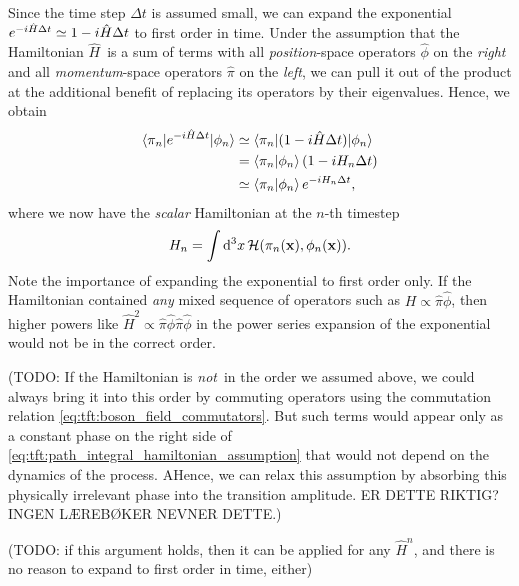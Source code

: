 Since the time step $\Delta t$ is assumed small, we can expand the exponential $e^{- i \hat{H} \Delta t} \simeq 1 - i \hat{H} \Delta t$ to first order in time.
Under the assumption that the Hamiltonian $\hat{H}$ is a sum of terms with all \emph{position}-space operators $\hat{\phi}$ on the \emph{right} and all \emph{momentum}-space operators $\hat{\pi}$ on the \emph{left}, we can pull it out of the product at the additional benefit of replacing its operators by their eigenvalues.
Hence, we obtain
\begin{equation}
\begin{split}
	\braket{\pi_n | e^{- i \hat{H} \Delta t} | \phi_n} &\simeq \braket{\pi_n | (1 - i \hat{H} \Delta t) | \phi_n} \\
	                                                   &=       \braket{\pi_n | \phi_n} (1 - i H_n \Delta t) \\
	                                                   &\simeq \braket{\pi_n | \phi_n} e^{- i H_n \Delta t}, \\
\end{split}
\label{eq:tft:path_integral_hamiltonian_assumption}
\end{equation}
where we now have the \emph{scalar} Hamiltonian at the $n$-th timestep
\begin{equation}
	H_n = \int \mathop{}\!\mathrm{d}^3 x \, \mathcal{H}(\pi_n(\mathbf{x}), \phi_n(\mathbf{x})) .
\label{eq:tft:hamiltonian_eigenvalues}
\end{equation}
Note the importance of expanding the exponential to first order only.
If the Hamiltonian contained \emph{any} mixed sequence of operators such as $H \propto \hat{\pi} \hat{\phi}$, then higher powers like $\hat{H}^2 \propto \hat{\pi} \hat{\phi} \hat{\pi} \hat{\phi}$ in the power series expansion of the exponential would not be in the correct order.

(TODO: If the Hamiltonian is \emph{not} in the order we assumed above, we could always bring it into this order by commuting operators using the commutation relation \eqref{eq:tft:boson_field_commutators}.
But such terms would appear only as a constant phase on the right side of \eqref{eq:tft:path_integral_hamiltonian_assumption} that would not depend on the dynamics of the process.
AHence, we can relax this assumption by absorbing this physically irrelevant phase into the transition amplitude. ER DETTE RIKTIG? INGEN LÆREBØKER NEVNER DETTE.)

(TODO: if this argument holds, then it can be applied for any $\hat{H}^n$, and there is no reason to expand to first order in time, either)

